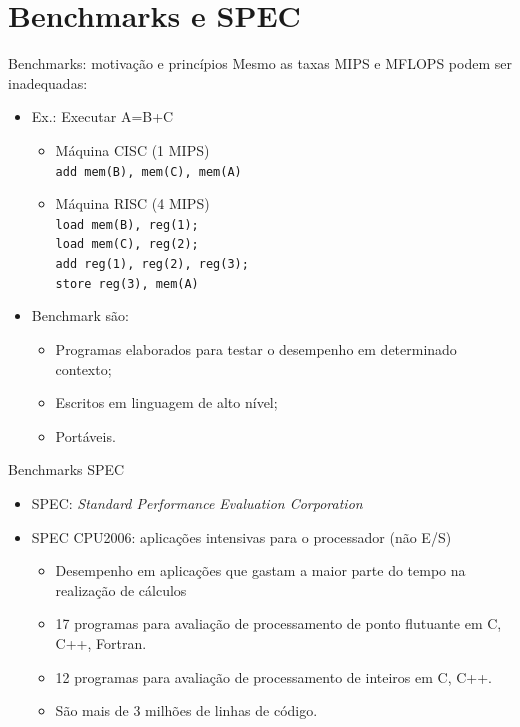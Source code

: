 \section[slide=true]{Benchmarks e SPEC}
\begin{slide}{Benchmarks: motivação e princípios}
Mesmo as taxas MIPS e MFLOPS podem ser inadequadas:\\
\begin{itemize}
 \item Ex.: Executar A=B+C\\
\begin{itemize}
   \item Máquina CISC (1 MIPS)\\
   \texttt{add mem(B), mem(C), mem(A)}
   
   \item Máquina RISC (4 MIPS)\\
   \texttt{load mem(B), reg(1);\\
       load mem(C), reg(2);\\
       add  reg(1), reg(2), reg(3);\\
       store reg(3), mem(A)}
\end{itemize}
   \item Benchmark são: 
   \begin{itemize}
      \item Programas elaborados para testar o desempenho em determinado contexto;
      \item Escritos em linguagem de alto nível;
      \item Portáveis.
\end{itemize}
\end{itemize}
\end{slide}

\begin{slide}{Benchmarks SPEC}
\begin{itemize}
	\item SPEC: \textit{Standard Performance Evaluation Corporation}
	\item SPEC CPU2006: aplicações intensivas para o processador (não E/S)
		\begin{itemize}
			\item Desempenho em aplicações que gastam a maior parte do tempo na realização de cálculos
			\item 17 programas para avaliação de processamento de ponto flutuante em C, C++, Fortran.
			\item 12 programas para avaliação de processamento de inteiros em C, C++.
			\item São mais de 3 milhões de linhas de código.
		\end{itemize}
\end{itemize}
\end{slide}

